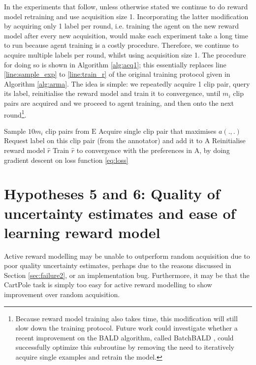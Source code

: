 \documentclass[11pt, a4paper, bibliography=totoc]{report}
\newcommand{\rp}{\hat{r}}
\newcommand{\expbuff}{\mathrm{E}}
\newcommand{\annbuff}{\mathrm{A}}
\begin{document}
In the experiments that follow, unless otherwise stated we continue to do reward model retraining and use acquisition size 1. Incorporating the latter modification by acquiring only 1 label per round, i.e. training the agent on the new reward model after every new acquisition, would make each experiment take a long time to run because agent training is a costly procedure. Therefore, we continue to acquire multiple labels per round, whilst using acquisition size 1. The procedure for doing so is shown in Algorithm \ref{alg:acq1}; this essentially replaces line \ref{line:sample_exp} to \ref{line:train_r} of the original training protocol given in Algorithm \ref{alg:arma}. The idea is simple: we repeatedly acquire 1 clip pair, query its label, reinitialise the reward model and train it to convergence, until $ m_i $ clip pairs are acquired and we proceed to agent training, and then onto the next round\footnote{Because reward model training also takes time, this modification will still slow down the training protocol. Future work could investigate whether a recent improvement on the BALD algorithm, called BatchBALD \cite{Kirsch2019a}, could successfully optimize this subroutine by removing the need to iteratively acquire single examples and retrain the model.}.
\begin{algorithm}
	\caption{Acquiring a batch of clip pairs with acquisition size 1.}
	\label{alg:acq1}
	\begin{algorithmic}[1]
		\State Sample $ 10m_i $ clip pairs from $ \expbuff $ \label{line:sample_exp2}
		\Repeat
		\State Acquire single clip pair that maximises $ a(.,.) $ \label{line:acq2}
		\State Request label on this clip pair (from the annotator) and add it to $ \annbuff $
		\State Reinitialise reward model $ \rp $
		\State Train $ \rp $ to convergence with the preferences in $ \annbuff $, by doing gradient descent on loss function \ref{eq:loss}
	\end{algorithmic}
\end{algorithm}

\section{Hypotheses 5 and 6: Quality of uncertainty estimates and ease of learning reward model}
Active reward modelling may be unable to outperform random acquisition due to poor quality uncertainty estimates, perhaps due to the reasons discussed in Section \ref{sec:failure2}, or an implementation bug. Furthermore, it may be that the CartPole task is simply too easy for active reward modelling to show improvement over random acquisition.
\end{document}
